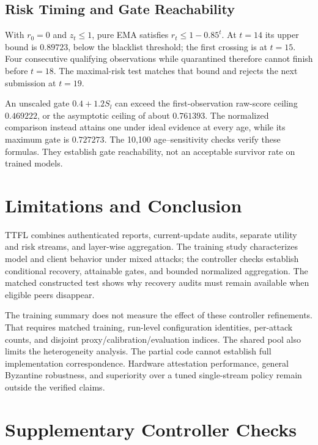 \documentclass[conference,compsoc]{IEEEtran}
\begin{document}
\subsection{Risk Timing and Gate Reachability}

With $r_0=0$ and $z_t\le1$, pure EMA satisfies $r_t\le1-0.85^t$.
At $t=14$ its upper bound is $0.89723$, below the blacklist threshold; the
first crossing is at $t=15$. Four consecutive qualifying observations while
quarantined therefore cannot finish before $t=18$. The maximal-risk test
matches that bound and rejects the next submission at $t=19$.

An unscaled gate $0.4+1.2S_l$ can exceed the first-observation raw-score
ceiling $0.469222$, or the asymptotic ceiling of about $0.761393$. The normalized
comparison instead attains one under ideal evidence at every age, while its
maximum gate is $0.727273$. The 10,100 age--sensitivity checks verify these
formulas. They establish gate reachability, not an acceptable survivor rate
on trained models.

\FloatBarrier
\section{Limitations and Conclusion}

TTFL combines authenticated reports, current-update audits, separate utility
and risk streams, and layer-wise aggregation. The training study characterizes
model and client behavior under mixed attacks; the controller checks establish
conditional recovery, attainable gates, and bounded normalized aggregation.
The matched constructed test shows why recovery audits must remain available
when eligible peers disappear.

The training summary does not measure the effect of these controller
refinements. That requires matched training, run-level configuration identities,
per-attack counts, and disjoint proxy/calibration/evaluation indices. The shared
pool also limits the heterogeneity analysis. The partial code cannot establish
full implementation correspondence. Hardware attestation performance, general
Byzantine robustness, and superiority over a tuned single-stream policy remain
outside the verified claims.

\FloatBarrier
\appendices
\section{Supplementary Controller Checks}
\end{document}
